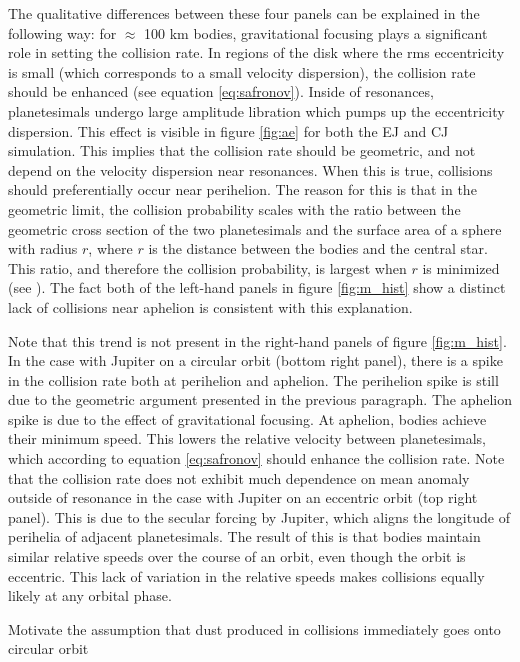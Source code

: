 \documentclass[onecolumn]{aastex63}
\begin{document}
The qualitative differences between these four panels can be explained in the following way: for $\approx$ 100 km bodies, 
gravitational focusing plays a significant role in setting the collision rate. In regions of the disk where the rms eccentricity is small 
(which corresponds to a small velocity dispersion), the collision rate should be enhanced (see equation \ref{eq:safronov}). Inside of 
resonances, planetesimals undergo large amplitude libration which pumps up the eccentricity dispersion. This effect is visible in 
figure \ref{fig:ae} for both the EJ and CJ simulation. This implies that the collision rate should be geometric, and not depend on the 
velocity dispersion near resonances. When this is true, collisions should preferentially occur near perihelion. The reason for this is 
that in the geometric limit, the collision probability scales with the ratio between the geometric cross section of the two planetesimals 
and the surface area of a sphere with radius $r$, where $r$ is the distance between the bodies and the central star. This ratio, and 
therefore the collision probability, is largest when $r$ is minimized (see \citet{2003AJ....125.2692L}). The fact both of the left-hand 
panels in figure \ref{fig:m_hist} show a distinct lack of collisions near aphelion is consistent with this explanation.

Note that this trend is not present in the right-hand panels of figure \ref{fig:m_hist}. In the case with Jupiter on a circular orbit (bottom right panel), there is a spike in the collision rate both at perihelion and aphelion. The perihelion spike is still due to the geometric argument presented in the previous paragraph. The aphelion spike is due to the effect of gravitational focusing. At aphelion, bodies achieve their minimum speed. This lowers the relative velocity between planetesimals, which according to equation \ref{eq:safronov} should enhance the collision rate. Note that the collision rate does not exhibit much dependence on mean anomaly outside of resonance in the case with Jupiter on an eccentric orbit (top right panel). This is due to the secular forcing by Jupiter, which aligns the longitude of perihelia of adjacent planetesimals. The result of this is that bodies maintain similar relative speeds over the course of an orbit, even though the orbit is eccentric. This lack of variation in the relative speeds makes collisions equally likely at any orbital phase.

Motivate the assumption that dust produced in collisions immediately goes onto circular orbit
\end{document}
